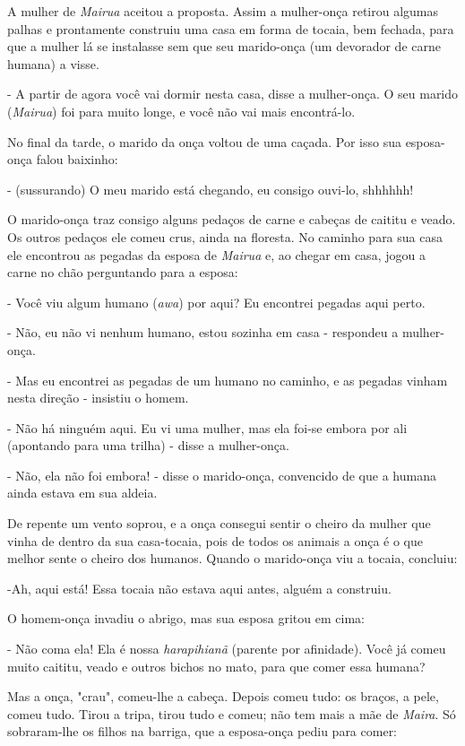 A mulher de \emph{Mairua} aceitou a proposta. Assim a mulher-onça
retirou algumas palhas e prontamente construiu uma casa em forma de
tocaia, bem fechada, para que a mulher lá se instalasse sem que seu
marido-onça (um devorador de carne humana) a visse.

- A partir de agora você vai dormir nesta casa, disse a mulher-onça. O
seu marido (\emph{Mairua}) foi para muito longe, e você não vai mais
encontrá-lo.

No final da tarde, o marido da onça voltou de uma caçada. Por isso sua
esposa-onça falou baixinho:

- (sussurando) O meu marido está chegando, eu consigo ouvi-lo, shhhhhh!

O marido-onça traz consigo alguns pedaços de carne e cabeças de caititu
e veado. Os outros pedaços ele comeu crus, ainda na floresta. No caminho
para sua casa ele encontrou as pegadas da esposa de \emph{Mairua} e, ao
chegar em casa, jogou a carne no chão perguntando para a esposa:

- Você viu algum humano (\emph{awa}) por aqui? Eu encontrei pegadas aqui
perto.

- Não, eu não vi nenhum humano, estou sozinha em casa - respondeu a
mulher-onça.

- Mas eu encontrei as pegadas de um humano no caminho, e as pegadas
vinham nesta direção - insistiu o homem.

- Não há ninguém aqui. Eu vi uma mulher, mas ela foi-se embora por ali
(apontando para uma trilha) - disse a mulher-onça.

- Não, ela não foi embora! - disse o marido-onça, convencido de que a
humana ainda estava em sua aldeia.

De repente um vento soprou, e a onça consegui sentir o cheiro da mulher
que vinha de dentro da sua casa-tocaia, pois de todos os animais a onça
é o que melhor sente o cheiro dos humanos. Quando o marido-onça viu a
tocaia, concluiu:

-Ah, aqui está! Essa tocaia não estava aqui antes, alguém a construiu.

O homem-onça invadiu o abrigo, mas sua esposa gritou em cima:

- Não coma ela! Ela é nossa \emph{harapihianã} (parente por afinidade).
Você já comeu muito caititu, veado e outros bichos no mato, para que
comer essa humana?

Mas a onça, "crau", comeu-lhe a cabeça. Depois comeu tudo: os braços, a
pele, comeu tudo. Tirou a tripa, tirou tudo e comeu; não tem mais a mãe
de \emph{Maira}. Só sobraram-lhe os filhos na barriga, que a esposa-onça
pediu para comer:

